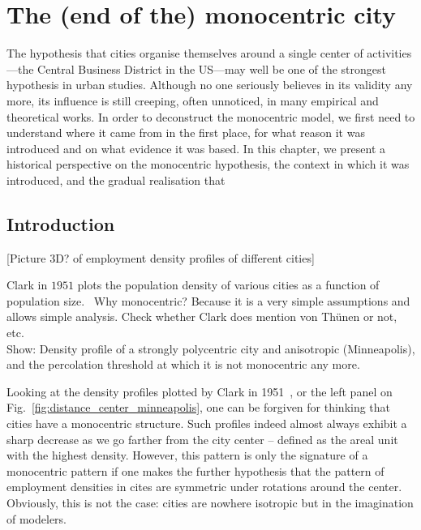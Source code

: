 %
\chapter{The (end of the) monocentric city}
\label{chap:monocentric_introduction}

The hypothesis that cities organise themselves around a single center of
activities---the Central Business District in the US---may well be one of the
strongest hypothesis in urban studies. Although no one seriously believes
in its validity any more, its influence is still creeping, often unnoticed, in many
empirical and theoretical works.
In order to deconstruct the monocentric model, we first need to understand where
it came from in the first place, for what reason it was introduced and on what
evidence it was based. In this chapter, we present a historical perspective on
the monocentric hypothesis, the context in which it was introduced, and the
gradual realisation that 

\section{Introduction}
\label{sec:introduction}

[Picture 3D? of employment density profiles of different cities]

Clark in $1951$ plots the population density of various cities as a function of
population size.~\cite{Clark:1951}
Why monocentric? Because it is a very simple assumptions and allows simple
analysis. Check whether Clark does mention von Th\"unen or not, etc.\\


Show: Density profile of a strongly polycentric city and anisotropic
(Minneapolis), and the percolation threshold at which it is not monocentric any
more.

Looking at the density profiles plotted by Clark in 1951~\cite{Clark:1951}, or
the left panel on Fig.~\ref{fig:distance_center_minneapolis}, one can be
forgiven for thinking that cities have a monocentric structure. Such profiles
indeed almost always exhibit a sharp decrease as we go farther from the city
center -- defined as the areal unit with the highest density. However, this
pattern is only the signature of a monocentric pattern if one makes the further
hypothesis that the pattern of employment densities in cites are symmetric
under rotations around the center. Obviously, this is not the case: cities are
nowhere isotropic but in the imagination of modelers.

